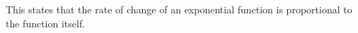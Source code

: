 This states that the rate of change of an exponential function is proportional to the function itself.


%
%
%
%
%
%
%
%
%
%
%
%
%

